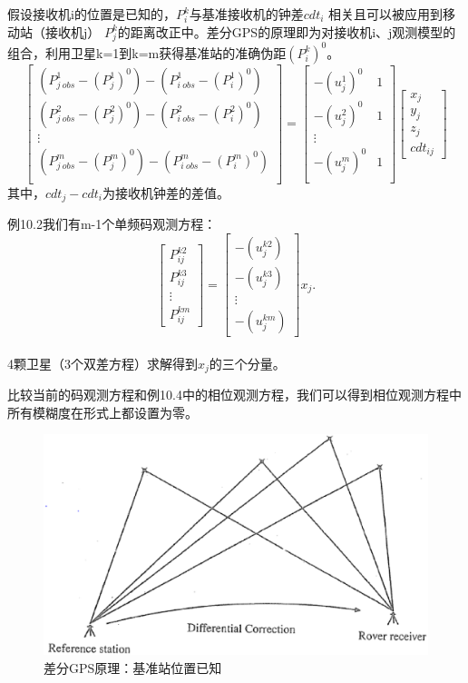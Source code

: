 假设接收机i的位置是已知的，$P_{i}^{k}$与基准接收机的钟差$cdt_{i}$ 相关且可以被应用到移动站（接收机j） $P_{j}^{k}$的距离改正中。差分GPS的原理即为对接收机i、j观测模型的组合，利用卫星k=1到k=m获得基准站的准确伪距$(P_{i}^{k})^{0}$。
$$
\begin{bmatrix}
(P_{j \ obs}^{1}-(P_{j}^{1})^{0})-(P_{i \ obs}^{1}-(P_{i}^{1})^{0})\\
(P_{j \ obs}^{2}-(P_{j}^{2})^{0})-(P_{i \ obs}^{2}-(P_{i}^{2})^{0})\\
\vdots \\
(P_{j \ obs}^{m}-(P_{j}^{m})^{0})-(P_{i \ obs}^{m}-(P_{i}^{m})^{0})\\
\end{bmatrix}
=
\begin{bmatrix}
-(u_{j}^{1})^{0}&1\\
-(u_{j}^{2})^{0}&1\\
\vdots \\
-(u_{j}^{m})^{0}&1\\
\end{bmatrix}
\begin{bmatrix}
x_{j}\\y_{j}\\z_{j}\\cdt_{ij}
\end{bmatrix}
$$
其中，$cdt_{j}-cdt_{i}$为接收机钟差的差值。

例10.2我们有m-1个单频码观测方程：
$$
\begin{bmatrix}
P_{ij}^{k2}\\
P_{ij}^{k3}\\
\vdots \\
P_{ij}^{km}
\end{bmatrix}
=\begin{bmatrix}
-(u_{j}^{k2})\\
-(u_{j}^{k3})\\
\vdots \\
-(u_{j}^{km})
\end{bmatrix}
x_{j}.
$$\\
4颗卫星（3个双差方程）求解得到$x_{j}$的三个分量。

比较当前的码观测方程和例10.4中的相位观测方程，我们可以得到相位观测方程中所有模糊度在形式上都设置为零。

\begin{figure}
	\centering
	\includegraphics[width=0.4\linewidth]{TeX_files/Part03/chapter10/image/9-4}
	\caption{差分GPS原理：基准站位置已知}
	\label{fig:9-4}
\end{figure}

